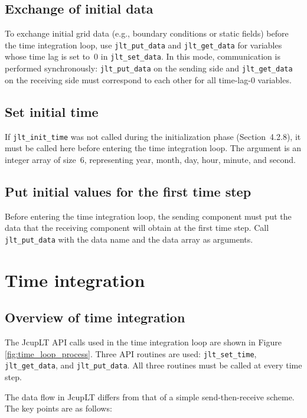 \documentclass[11pt,a4paper]{report}
\newcommand{\figref}[1]{Figure \ref{#1}}
\begin{document}
\subsection{Exchange of initial data}

To exchange initial grid data
(e.g., boundary conditions or static fields)
before the time integration loop,
use \texttt{jlt\_put\_data} and \texttt{jlt\_get\_data}
for variables whose time lag is set to~0
in \texttt{jlt\_set\_data}.
In this mode, communication is performed synchronously:
\texttt{jlt\_put\_data} on the sending side
and \texttt{jlt\_get\_data} on the receiving side
must correspond to each other
for all time-lag-0 variables.

\subsection{Set initial time}

If \texttt{jlt\_init\_time} was not called
during the initialization phase (Section~4.2.8),
it must be called here
before entering the time integration loop.
The argument is an integer array of size~6,
representing year, month, day, hour, minute, and second.

\subsection{Put initial values for the first time step}

Before entering the time integration loop,
the sending component must put the data
that the receiving component will obtain at the first time step.
Call \texttt{jlt\_put\_data} with the data name
and the data array as arguments.



\section{Time integration}

\subsection{Overview of time integration}

The JcupLT API calls used in the time integration loop
are shown in \figref{fig:time_loop_process}.
Three API routines are used:
\texttt{jlt\_set\_time},
\texttt{jlt\_get\_data},
and \texttt{jlt\_put\_data}.
All three routines must be called at every time step.

The data flow in JcupLT differs from
that of a simple send-then-receive scheme.
The key points are as follows:
\end{document}
